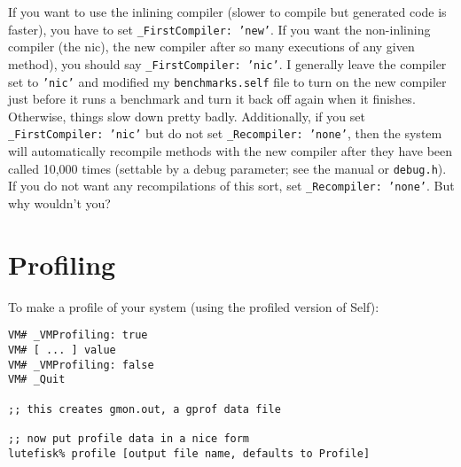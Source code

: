 \begin{enumerate}
If you want to use the inlining compiler (slower to compile but
generated code is faster), you have to set {\tt \_FirstCompiler:
'new'}.  If you want the non-inlining compiler (the nic), the new
compiler after so many executions of any given method), you should say
{\tt \_FirstCompiler: 'nic'}.  I generally leave the compiler set to
{\tt 'nic'} and modified my {\tt benchmarks.self} file to turn on the
new compiler just before it runs a benchmark and turn it back off
again when it finishes.  Otherwise, things slow down pretty badly.
Additionally, if you set {\tt
\_FirstCompiler: 'nic'} but do not set {\tt \_Recompiler: 'none'},
then the system will automatically recompile methods with the new
compiler after they have been called 10,000 times (settable by a debug
parameter; see the manual or {\tt debug.h}).  If you do not want any
recompilations of this sort, set {\tt \_Recompiler: 'none'}.  But why
wouldn't you?
\end{enumerate}

\section{Profiling}

To make a profile of your system (using the profiled version of Self):
\bq
\begin{tt}
\begin{verbatim}
VM# _VMProfiling: true
VM# [ ... ] value
VM# _VMProfiling: false
VM# _Quit

;; this creates gmon.out, a gprof data file

;; now put profile data in a nice form
lutefisk% profile [output file name, defaults to Profile]
\end{verbatim}
\end{tt}
\eq

